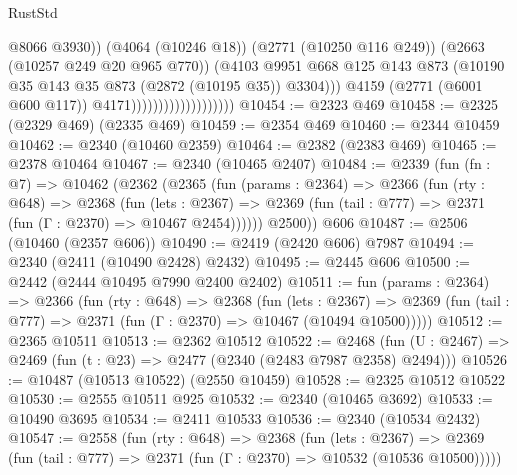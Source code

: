 \begin{lexlean}{RustStd}
\begin{coremodule}
                                                @8066
                                                @3930))
                                            (@4064 (@10246 @18))
                                            (@2771 (@10250 @116 @249))
                                            (@2663 (@10257 @249 @20 @965 @770))
                                            (@4103
                                              @9951
                                              @668
                                              @125
                                              @143
                                              @873
                                              (@10190
                                                @35
                                                @143
                                                @35
                                                @873
                                                (@2872 (@10195 @35))
                                                @3304)))
                                          @4159
                                          (@2771 (@6001 @600 @117))
                                          @4171)))))))))))))))))))
@10454 := @2323 @469
@10458 := @2325 (@2329 @469) (@2335 @469)
@10459 := @2354 @469
@10460 := @2344 @10459
@10462 := @2340 (@10460 @2359)
@10464 := @2382 (@2383 @469)
@10465 := @2378 @10464
@10467 := @2340 (@10465 @2407)
@10484 := @2339
    (fun (fn : @7) =>
    @10462
      (@2362
        (@2365
          (fun (params : @2364) =>
          @2366
            (fun (rty : @648) =>
            @2368
              (fun (lets : @2367) =>
              @2369 (fun (tail : @777) => @2371 (fun (Γ : @2370) => @10467 @2454))))))
        @2500))
    @606
@10487 := @2506 (@10460 (@2357 @606))
@10490 := @2419 (@2420 @606) @7987
@10494 := @2340 (@2411 (@10490 @2428) @2432)
@10495 := @2445 @606
@10500 := @2442 (@2444 @10495 @7990 @2400 @2402)
@10511 := fun (params : @2364) =>
  @2366
    (fun (rty : @648) =>
    @2368
      (fun (lets : @2367) =>
      @2369 (fun (tail : @777) => @2371 (fun (Γ : @2370) => @10467 (@10494 @10500)))))
@10512 := @2365 @10511
@10513 := @2362 @10512
@10522 := @2468
    (fun (U : @2467) => @2469 (fun (t : @23) => @2477 (@2340 (@2483 @7987 @2358) @2494)))
@10526 := @10487 (@10513 @10522) (@2550 @10459)
@10528 := @2325 @10512 @10522
@10530 := @2555 @10511 @925
@10532 := @2340 (@10465 @3692)
@10533 := @10490 @3695
@10534 := @2411 @10533
@10536 := @2340 (@10534 @2432)
@10547 := @2558
    (fun (rty : @648) =>
    @2368
      (fun (lets : @2367) =>
      @2369 (fun (tail : @777) => @2371 (fun (Γ : @2370) => @10532 (@10536 @10500)))))

\end{coremodule}
\end{lexlean}
